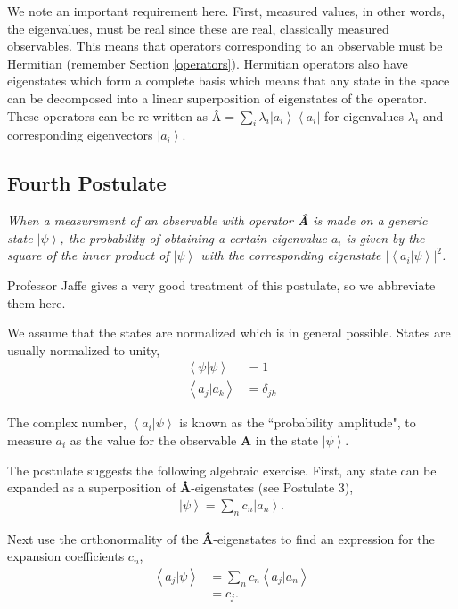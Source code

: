 \documentclass[11pt]{article} %
\newcommand{\bra}[1]{\left\langle #1 \right|}
\newcommand{\ket}[1]{\left|#1\right\rangle}
\newcommand{\braket}[2]{\left\langle#1 |  #2\right\rangle}
\begin{document}
We note an important requirement here. First, measured values, in other words, the eigenvalues, must be real since these are real, classically measured observables. This means that operators corresponding to an observable must be Hermitian (remember Section \ref{operators}). Hermitian operators also have eigenstates which form a complete basis which means that any state in the space can be decomposed into a linear superposition of eigenstates of the operator. These operators can be re-written as $\textbf{\^A} = \sum_i\lambda_i\ket{a_i}\bra{a_i}$ for eigenvalues $\lambda_i$ and corresponding eigenvectors $\ket{a_i}$.

\subsection{Fourth Postulate} \label{fourth_pos}
\begin{center}
    \textit{When a measurement of an observable with operator \textbf{\^A} is made on a generic state $\ket{\psi}$, the probability of obtaining a certain eigenvalue $a_i$ is given by the square of the inner product of $\ket{\psi}$ with the corresponding eigenstate $\left|\braket{a_i}{\psi}\right|^2$.}
\end{center}

Professor Jaffe gives a very good treatment of this postulate, so we abbreviate them here.

We assume that the states are normalized which is in general possible. States are usually normalized to unity,
\begin{align}
    \braket{\psi}{\psi} &= 1\nonumber\\
    \braket{a_j}{a_k} &= \delta_{jk}
\end{align}

The complex number, $\braket{a_i}{\psi}$ is known as the ``probability amplitude", to measure $a_i$ as the value for the observable \textbf{A} in the state $\ket{\psi}$.

The postulate suggests the following algebraic exercise. First, any state can be expanded as a superposition of \textbf{\^A}-eigenstates (see Postulate 3),
\begin{align}
    \ket{\psi} = \sum_nc_n\ket{a_n}.
\end{align}

Next use the orthonormality of the \textbf{\^A}-eigenstates to find an expression for the expansion coefficients $c_n$,
\begin{align}
    \braket{a_j}{\psi} &= \sum_nc_n\braket{a_j}{a_n}\\
    &= c_j.
\end{align}
\end{document}
